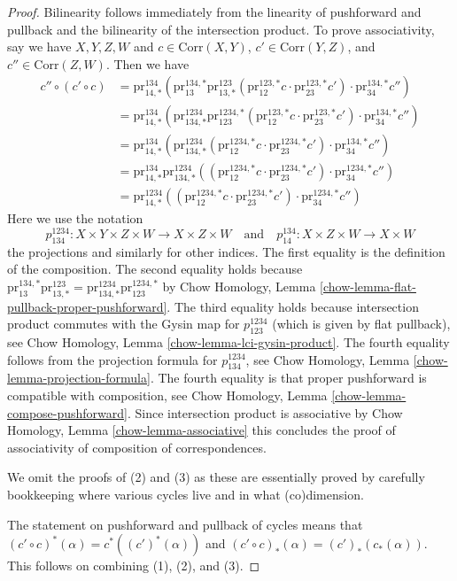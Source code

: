 \begin{proof}
Bilinearity follows immediately from the linearity of pushforward
and pullback and the bilinearity of the intersection product.
To prove associativity, say we have
$X, Y, Z, W$ and $c \in \text{Corr}(X, Y)$, $c' \in \text{Corr}(Y, Z)$, and
$c'' \in \text{Corr}(Z, W)$. Then we have
\begin{align*}
c'' \circ (c' \circ c)
& =
\text{pr}^{134}_{14, *}(
\text{pr}^{134, *}_{13}
\text{pr}^{123}_{13, *}(\text{pr}^{123, *}_{12}c \cdot
\text{pr}^{123, *}_{23}c')
\cdot \text{pr}^{134, *}_{34}c'') \\
& =
\text{pr}^{134}_{14, *}(
\text{pr}^{1234}_{134, *}
\text{pr}^{1234, *}_{123}(\text{pr}^{123, *}_{12}c \cdot
\text{pr}^{123, *}_{23}c')
\cdot \text{pr}^{134, *}_{34}c'') \\
& =
\text{pr}^{134}_{14, *}(
\text{pr}^{1234}_{134, *}
(\text{pr}^{1234, *}_{12}c \cdot
\text{pr}^{1234, *}_{23}c')
\cdot \text{pr}^{134, *}_{34}c'') \\
& =
\text{pr}^{134}_{14, *}
\text{pr}^{1234}_{134, *}
((\text{pr}^{1234, *}_{12}c \cdot
\text{pr}^{1234, *}_{23}c')
\cdot \text{pr}^{1234, *}_{34}c'') \\
& =
\text{pr}^{1234}_{14, *}(
(\text{pr}^{1234, *}_{12}c \cdot
\text{pr}^{1234, *}_{23}c') \cdot
\text{pr}^{1234, *}_{34}c'')
\end{align*}
Here we use the notation
$$
p^{1234}_{134} : X \times Y \times Z \times W \to X \times Z \times W
\quad\text{and}\quad
p^{134}_{14} : X \times Z \times W \to X \times W
$$
the projections and similarly for other indices.
The first equality is the definition of the composition.
The second equality holds because
$\text{pr}^{134, *}_{13} \text{pr}^{123}_{13, *} =
\text{pr}^{1234}_{134, *} \text{pr}^{1234, *}_{123}$
by Chow Homology, Lemma \ref{chow-lemma-flat-pullback-proper-pushforward}.
The third equality holds because intersection product commutes
with the Gysin map for $p^{1234}_{123}$ (which is given by flat pullback), see
Chow Homology, Lemma \ref{chow-lemma-lci-gysin-product}.
The fourth equality follows from the projection formula for
$p^{1234}_{134}$, see Chow Homology, Lemma \ref{chow-lemma-projection-formula}.
The fourth equality is that proper pushforward is compatible
with composition, see Chow Homology, Lemma \ref{chow-lemma-compose-pushforward}.
Since intersection product is associative by
Chow Homology, Lemma \ref{chow-lemma-associative}
this concludes the proof of associativity of composition of correspondences.

\medskip\noindent
We omit the proofs of (2) and (3) as these are essentially proved by
carefully bookkeeping where various cycles live and in what (co)dimension.

\medskip\noindent
The statement on pushforward and pullback of cycles
means that $(c' \circ c)^*(\alpha) = c^*((c')^*(\alpha))$ and
$(c' \circ c)_*(\alpha) = (c')_*(c_*(\alpha))$.
This follows on combining (1), (2), and (3).
\end{proof}

